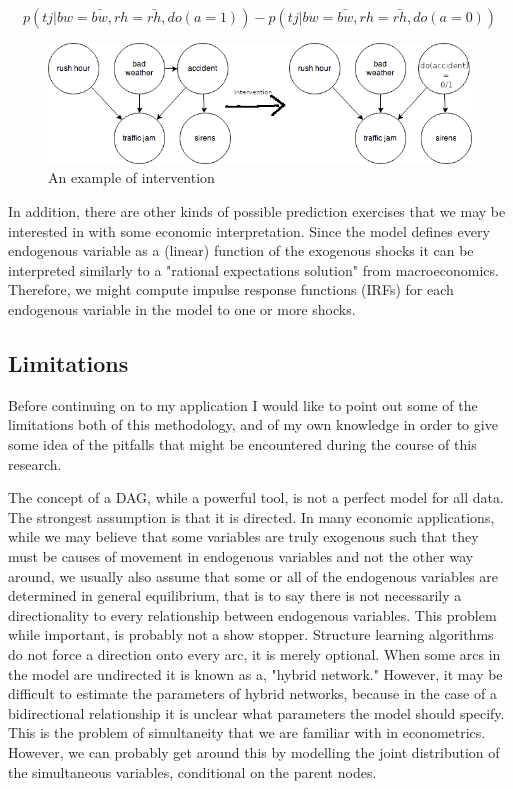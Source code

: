 \documentclass{article}
\begin{document}
\begin{equation}
    \label{eq3}
    p(tj | bw = \bar{bw}, rh = \bar{rh}, do(a=1)) - p(tj | bw = \bar{bw}, rh = \bar{rh}, do(a=0))
\end{equation}


\begin{figure}
\centering
\label{dag3}
\includegraphics[width=\textwidth]{trafficjam_intervention.png}
\caption{An example of intervention}
\end{figure}

In addition, there are other kinds of possible prediction exercises that we may be interested in with some economic interpretation. Since the model defines every endogenous variable as a (linear) function of the exogenous shocks it can be interpreted similarly to a "rational expectations solution" from macroeconomics. Therefore, we might compute impulse response functions (IRFs) for each endogenous variable in the model to one or more shocks.

\subsection{Limitations}

Before continuing on to my application I would like to point out some of the limitations both of this methodology, and of my own knowledge in order to give some idea of the pitfalls that might be encountered during the course of this research. 

The concept of a DAG, while a powerful tool, is not a perfect model for all data. The strongest assumption is that it is directed. In many economic applications, while we may believe that some variables are truly exogenous such that they must be causes of movement in endogenous variables and not the other way around, we usually also assume that some or all of the endogenous variables are determined in general equilibrium, that is to say there is not necessarily a directionality to every relationship between endogenous variables. This problem while important, is probably not a show stopper. Structure learning algorithms do not force a direction onto every arc, it is merely optional. When some arcs in the model are undirected it is known as a, "hybrid network." However, it may be difficult to estimate the parameters of hybrid networks, because in the case of a bidirectional relationship it is unclear what parameters the model should specify. This is the problem of simultaneity that we are familiar with in econometrics. However, we can probably get around this by modelling the joint distribution of the simultaneous variables, conditional on the parent nodes.
\end{document}
